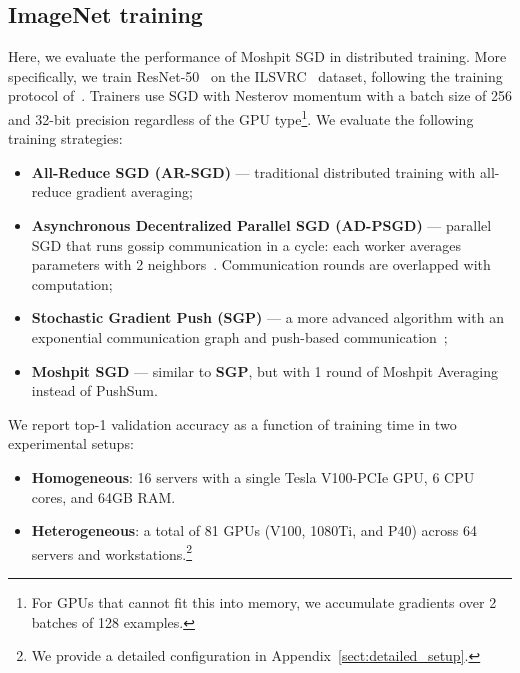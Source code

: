 \pagebreak[4]


\subsection{ImageNet training}\label{sect:experiments_vision}
Here, we evaluate the performance of Moshpit SGD in distributed training. More specifically, we train ResNet-50~\cite{resnet} on the ILSVRC~\cite{imagenet_cvpr09} dataset, following the training protocol of~\cite{goyal2017accurate}. Trainers use SGD with Nesterov momentum with a batch size of 256 and 32-bit precision regardless of the GPU type\footnote{For GPUs that cannot fit this into memory, we accumulate gradients over 2 batches of 128 examples.}. We evaluate the following training strategies:
\begin{itemize}[leftmargin=*]\vspace{-2px}
    \item \textbf{All-Reduce SGD (AR-SGD)} --- traditional distributed training with all-reduce gradient averaging;
    \item \textbf{Asynchronous Decentralized Parallel SGD (AD-PSGD)} --- parallel SGD that runs gossip communication in a cycle: each worker averages parameters with 2 neighbors~\cite{ad_psgd}. Communication rounds are overlapped with computation;
    \item \textbf{Stochastic Gradient Push (SGP)} --- a more advanced algorithm with an exponential communication graph and push-based communication~\cite{sgpush};
    \item \textbf{Moshpit SGD} --- similar to \textbf{SGP}, but with 1 round of Moshpit Averaging instead of PushSum.
\end{itemize}\vspace{-2px}

We report top-1 validation accuracy as a function of training time in two experimental setups:
\begin{itemize}[leftmargin=*]\vspace{-4px}
    \item \textbf{Homogeneous}: 16 servers with a single Tesla V100-PCIe GPU, 6 CPU cores, and 64GB RAM.
    \item \textbf{Heterogeneous}: a total of 81 GPUs (V100, 1080Ti, and P40) across 64 servers and workstations.\footnote{We provide a detailed configuration in Appendix~\ref{sect:detailed_setup}.}
\end{itemize}\vspace{-4px}

